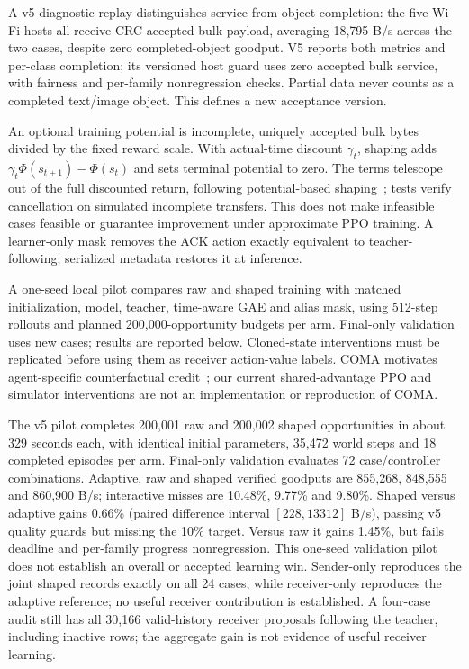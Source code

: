 \documentclass[11pt]{article}
\begin{document}
A v5 diagnostic replay distinguishes service from object completion: the five
Wi-Fi hosts all receive CRC-accepted bulk payload, averaging 18,795 B/s across
the two cases, despite zero completed-object goodput. V5 reports both metrics and
per-class completion; its versioned host guard uses zero accepted bulk service,
with fairness and per-family nonregression checks. Partial data never counts as
a completed text/image object. This defines a new acceptance version.

An optional training potential is incomplete, uniquely accepted bulk bytes
divided by the fixed reward scale. With actual-time discount $\gamma_t$, shaping
adds $\gamma_t\Phi(s_{t+1})-\Phi(s_t)$ and sets terminal potential to zero.
The terms telescope out of the full discounted return, following potential-based
shaping~\cite{ng1999shaping}; tests verify cancellation on simulated incomplete
transfers. This does not make infeasible cases feasible or guarantee improvement
under approximate PPO training. A learner-only mask removes the ACK action exactly
equivalent to teacher-following; serialized metadata restores it at inference.

A one-seed local pilot compares raw and shaped training with matched initialization,
model, teacher, time-aware GAE and alias mask, using 512-step rollouts and planned
200,000-opportunity budgets per arm. Final-only validation uses new cases; results are reported below. Cloned-state interventions must be replicated before using them
as receiver action-value labels. COMA motivates agent-specific counterfactual
credit~\cite{foerster2018coma}; our current shared-advantage PPO and simulator
interventions are not an implementation or reproduction of COMA.

The v5 pilot completes 200,001 raw and 200,002 shaped opportunities in about
329 seconds each, with identical initial parameters, 35,472 world steps and
18 completed episodes per arm. Final-only validation evaluates 72 case/controller
combinations. Adaptive, raw and shaped verified goodputs are 855,268, 848,555 and
860,900 B/s; interactive misses are 10.48\%, 9.77\% and 9.80\%. Shaped versus
adaptive gains 0.66\% (paired difference interval $[228,13312]$ B/s), passing
v5 quality guards but missing the 10\% target. Versus raw it gains 1.45\%, but
fails deadline and per-family progress nonregression. This one-seed validation
pilot does not establish an overall or accepted learning win. Sender-only reproduces
the joint shaped records exactly on all 24 cases, while receiver-only reproduces
the adaptive reference; no useful receiver contribution is established. A four-case audit
still has all 30,166 valid-history receiver proposals following the teacher,
including inactive rows; the aggregate gain is not evidence of useful receiver
learning.
\end{document}
